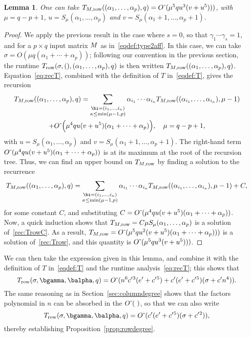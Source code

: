 \documentclass[12pt]{article}
\newtheorem{lemma}[definition]{Lemma}
\begin{document}
\begin{lemma}
  One can take $T_{M,{\rm row}}((\alpha_1,\dots,\alpha_p),q)= {O}{\,\tilde{ }\,}(
  \mu^5 q u^3(v+u^5 )))$, with $\mu=q-p+1$,
  $u=S_{\mu}(\alpha_1,\dots,\alpha_p)$ and
  $v=S_{\mu}(\alpha_1+1,\dots,\alpha_p+1)$.
\end{lemma}
\begin{proof}
  We apply the previous result in the case where $s=0$, so that
  $\gamma_1 \cdots \gamma_s=1$, and for a $p \times q$ input matrix
  ${M}$ as in~\eqref{eqdef:type2aff}. In this case, we can take
  $\sigma=O(\mu q(\alpha_1 + \cdots + \alpha_p))$; following our
  convention in the previous section, the runtime $T_{\rm
    row}(\sigma,(),(\alpha_1,\dots,\alpha_p),q)$ is then written
  $T_{M,{\rm row}}((\alpha_1,\dots,\alpha_p),q)$.
  Equation~\eqref{eq:recT}, combined with the definition of $T$
  in~\eqref{eqdef:T}, gives the recursion
  \begin{multline}
  T_{M,{\rm row}}((\alpha_1,\dots,\alpha_p),q)=
\sum_{\substack{\bi=(i_1,\dots,i_\kappa)\\ \kappa\le\min(\mu-1,p)}}
\alpha_{i_1} \cdots \alpha_{i_\kappa} T_{M,{\rm row}}((\alpha_{i_1},\dots,\alpha_{i_\kappa}), \mu-1)
\\ + \softO\Big(  
  \mu^4 q u(v+u^5 )(\alpha_1 + \cdots + \alpha_p)\Big), \quad \mu=q-p+1,\label{rec:Trow}
  \end{multline}
  with $u=S_{\mu}(\alpha_1,\dots,\alpha_p)$ and
  $v=S_{\mu}(\alpha_1+1,\dots,\alpha_p+1)$.  The right-hand term ${O}{\,\tilde{ }\,}(
  \mu^4 q u(v+u^5 )(\alpha_1 + \cdots + \alpha_p))$ is at its maximum at
  the root of the recursion tree.  Thus, we can find an upper bound on
  $T_{M,{\rm row}}$ by finding a solution to the recurrence
  \begin{align}\label{rec:TrowC}
  T_{M,{\rm row}}((\alpha_1,\dots,\alpha_p),q)=
\sum_{\substack{\bi=(i_1,\dots,i_\kappa)\\ \kappa\le\min(\mu-1,p)}}
\alpha_{i_1} \cdots \alpha_{i_\kappa} T_{M,{\rm row}}((\alpha_{i_1},\dots,\alpha_{i_\kappa}), \mu-1)
+ C,
  \end{align}
  for some constant $C$, and substituting $C={O}{\,\tilde{ }\,}( \mu^4 q u(v+u^5
  )(\alpha_1 + \cdots + \alpha_p))$.  Now, a quick induction shows
  that $T_{M,{\rm row}}= C \mu S_\mu(\alpha_1,\dots,\alpha_p)$ is a
  solution of~\eqref{rec:TrowC}. As a result,
   $T_{M,{\rm row}}= {O}{\,\tilde{ }\,}( \mu^5 q u^2(v+u^5 )(\alpha_1 + \cdots + \alpha_p)))$
  is a solution of~\eqref{rec:Trow},
  and this quantity is $ {O}{\,\tilde{ }\,}( \mu^5 q u^3(v+u^5 )))$.
\end{proof}

We can then take the expression given in this lemma, and combine it
with the definition of $T$ in~\eqref{eqdef:T} and the runtime
analysis~\eqref{eq:recT}; this shows that 
$$T_{\rm row}(\sigma,\bgamma,\balpha,q)= \softO( n^6 \rc^3(\re+\rc^5) +
\rc(\re+\rc^5 )(\sigma + \rc n^4)).$$ The same reasoning as in
Section~\ref{sec:columndegree} shows that the 
factors polynomial in $n$ can be absorbed in the 
${O}{\,\tilde{ }\,}(\ )$, so that we can also write 
$$T_{\rm row}(\sigma,\bgamma,\balpha,q)= \softO(\rc(\re+\rc^5 )(\sigma + \rc^2)),$$
thereby establishing Proposition~\ref{prop:rowdegree}.



 
\end{document}
